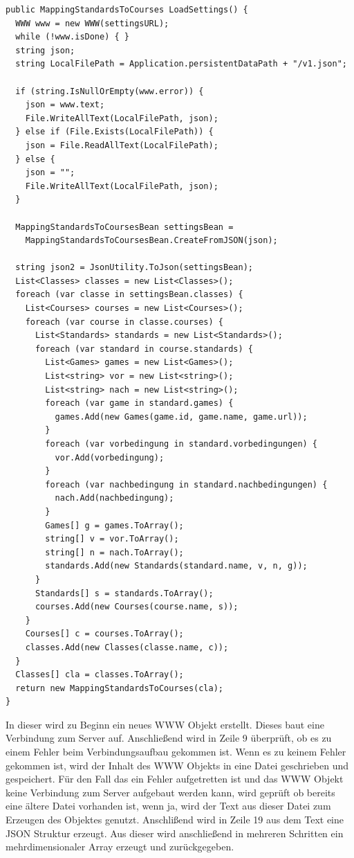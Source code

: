 			\begin{scriptsize}
				\lstset{
					float,
					caption=Methode LoadSettings, 
					language=[Sharp]C, 
					frame=single,  
					showstringspaces=false, 
					showspaces=false, 
					numbers=left, 
					captionpos=b, 
					belowcaptionskip=4pt,
					basicstyle=\ttfamily
				} 
				\begin{lstlisting}[label=lst:methode3]
public MappingStandardsToCourses LoadSettings() {
  WWW www = new WWW(settingsURL);
  while (!www.isDone) { }
  string json;
  string LocalFilePath = Application.persistentDataPath + "/v1.json";
	
  if (string.IsNullOrEmpty(www.error)) {
    json = www.text;
    File.WriteAllText(LocalFilePath, json);
  } else if (File.Exists(LocalFilePath)) {
    json = File.ReadAllText(LocalFilePath);
  } else {
    json = "";                
    File.WriteAllText(LocalFilePath, json);
  }

  MappingStandardsToCoursesBean settingsBean = 
    MappingStandardsToCoursesBean.CreateFromJSON(json);
  
  string json2 = JsonUtility.ToJson(settingsBean);	
  List<Classes> classes = new List<Classes>();
  foreach (var classe in settingsBean.classes) {
    List<Courses> courses = new List<Courses>();
    foreach (var course in classe.courses) {
      List<Standards> standards = new List<Standards>();
      foreach (var standard in course.standards) {
        List<Games> games = new List<Games>();
        List<string> vor = new List<string>();
        List<string> nach = new List<string>();
        foreach (var game in standard.games) {
          games.Add(new Games(game.id, game.name, game.url));
        }
        foreach (var vorbedingung in standard.vorbedingungen) {
          vor.Add(vorbedingung);
        }
        foreach (var nachbedingung in standard.nachbedingungen) {
          nach.Add(nachbedingung);
        }
        Games[] g = games.ToArray();
        string[] v = vor.ToArray();
        string[] n = nach.ToArray();
        standards.Add(new Standards(standard.name, v, n, g));
      }
      Standards[] s = standards.ToArray();
      courses.Add(new Courses(course.name, s));
    }
    Courses[] c = courses.ToArray();
    classes.Add(new Classes(classe.name, c));
  }
  Classes[] cla = classes.ToArray();
  return new MappingStandardsToCourses(cla);
}
				\end{lstlisting}
			\end{scriptsize}

				In dieser wird zu Beginn ein neues WWW Objekt erstellt. Dieses baut eine Verbindung zum Server auf. Anschließend wird in Zeile 9 überprüft, ob es zu einem Fehler beim Verbindungsaufbau gekommen ist. Wenn es zu keinem Fehler gekommen ist, wird der Inhalt des WWW Objekts in eine Datei geschrieben und gespeichert. Für den Fall das ein Fehler aufgetretten ist und das WWW Objekt keine Verbindung zum Server aufgebaut werden kann, wird geprüft ob bereits eine ältere Datei vorhanden ist, wenn ja, wird der Text aus dieser Datei zum Erzeugen des Objektes genutzt. Anschlißend wird in Zeile 19 aus dem Text eine \ac{JSON} Struktur erzeugt. Aus dieser wird anschließend in mehreren Schritten ein mehrdimensionaler Array erzeugt und zurückgegeben.

